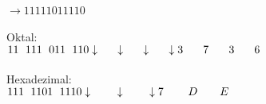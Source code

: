\documentclass[a4paper,12pt]{article}
\begin{document}
	\paragraph{}
	$\to 11111011110$ \\
	\\
	Oktal:\\
	$11 \hspace{6pt} 111 \hspace{6pt} 011 \hspace{6pt} 110 \\
	\downarrow \hspace{18pt} \downarrow \hspace{18pt} \downarrow \hspace{18pt} \downarrow \\
	3 \hspace{18pt} 7 \hspace{18pt} 3 \hspace{18pt} 6$\\
	\\
	Hexadezimal:\\
	$111\hspace{6pt} 1101 \hspace{6pt} 1110\\
	\downarrow \hspace{24pt} \downarrow \hspace{24pt} \downarrow \\
	7 \hspace{22pt} D \hspace{20pt} E$
	\pagebreak
\end{document}
